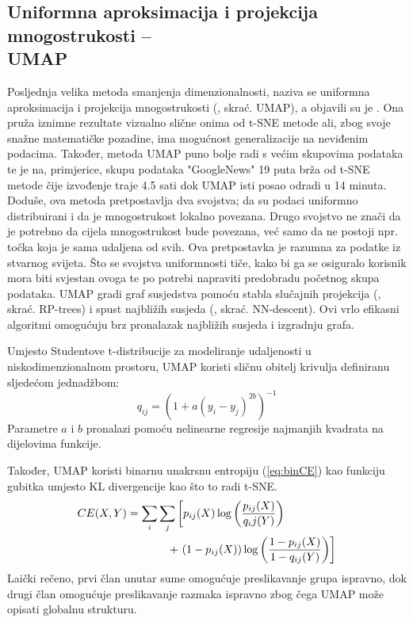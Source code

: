 \documentclass[times, utf8, diplomski]{fer}
\begin{document}
\subsection[Uniformna aproksimacija i projekcija mnogostrukosti -- UMAP]{Uniformna aproksimacija i projekcija mnogostrukosti --\\ UMAP}

Posljednja velika metoda smanjenja dimenzionalnosti, naziva se uniformna aproksimacija i projekcija mnogostrukosti (, skrać. UMAP), a objavili su je \cite{mcinnes2018umap}. Ona pruža iznimne rezultate vizualno slične onima od t-SNE metode ali, zbog svoje snažne matematičke pozadine, ima mogućnost generalizacije na neviđenim podacima. Također, metoda UMAP puno bolje radi s većim skupovima podataka te je na, primjerice, skupu podataka "GoogleNews" 19 puta brža od t-SNE metode čije izvođenje traje 4.5 sati dok UMAP isti posao odradi u 14 minuta. Doduše, ova metoda pretpostavlja dva svojstva; da su podaci uniformno distribuirani i da je mnogostrukost lokalno povezana. Drugo svojstvo ne znači da je potrebno da cijela mnogostrukost bude povezana, već samo da ne postoji npr. točka koja je sama udaljena od svih. Ova pretpostavka je razumna za podatke iz stvarnog svijeta. Što se svojstva uniformnosti tiče, kako bi ga se osiguralo korisnik mora biti svjestan ovoga te po potrebi napraviti predobradu početnog skupa podataka. UMAP gradi graf susjedstva pomoću stabla slučajnih projekcija (, skrać. RP-trees) i spust najbližih susjeda (, skrać. NN-descent). Ovi vrlo efikasni algoritmi omogućuju brz pronalazak najbližih susjeda i izgradnju grafa.

Umjesto Studentove t-distribucije za modeliranje udaljenosti u niskodimenzionalnom prostoru, UMAP koristi sličnu obitelj krivulja definiranu sljedećom jednadžbom:
\begin{equation}
    q_{ij} = (1 + a(y_i - y_j)^{2b})^{-1}
\end{equation}
Parametre $a$ i $b$ pronalazi pomoću nelinearne regresije najmanjih kvadrata na dijelovima funkcije.

Također, UMAP koristi binarnu unakrsnu entropiju (\ref{eq:binCE}) kao funkciju gubitka umjesto KL divergencije kao što to radi t-SNE.
\begin{align}
    CE(X, Y) & = \sum_i \sum_j \left[ p_{ij}(X) \log \left( \frac{p_{ij}(X)}{q_ij(Y)} \right)
    \right. \nonumber                                                                         \\ &\hphantom{ \sum_i \sum_j \big[} + \left.
        ( 1 - p_{ij}(X)) \log \left(\frac{1 - p_{ij}(X)}{1 - q_{ij}(Y)}\right) \right]
    \label{eq:binCE}
\end{align}
Laički rečeno, prvi član unutar sume omogućuje preslikavanje grupa ispravno, dok drugi član omogućuje preslikavanje razmaka ispravno zbog čega  UMAP može opisati globalnu strukturu.
\end{document}
